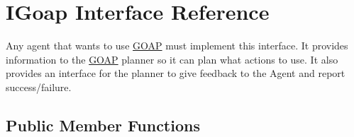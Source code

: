 \hypertarget{interface_i_goap}{}\section{I\+Goap Interface Reference}
\label{interface_i_goap}


Any agent that wants to use \hyperlink{class_g_o_a_p}{G\+O\+A\+P} must implement this interface. It provides information to the \hyperlink{class_g_o_a_p}{G\+O\+A\+P} planner so it can plan what actions to use. It also provides an interface for the planner to give feedback to the Agent and report success/failure.  


\subsection*{Public Member Functions}
